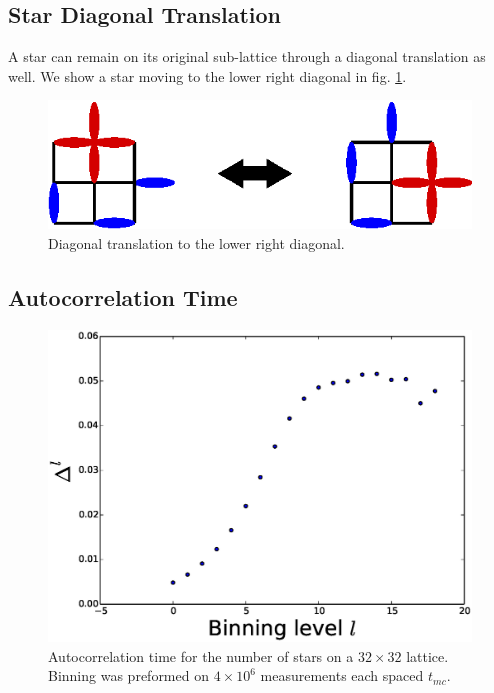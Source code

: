 \documentclass[aps,floatfix,11pt]{revtex4-1}
\begin{document}
\subsection{Star Diagonal Translation}
A star can remain on its original sub-lattice through a diagonal translation as well. We show a star moving
to the lower right diagonal in fig. \ref{fig:diag}. 
\begin{figure}[h]
    \centering
    \includegraphics[width=8.5 cm]{diag}
    \caption{Diagonal translation to the lower right diagonal.
\label{fig:diag}}
\end{figure}

\clearpage
\subsection{Autocorrelation Time}

\begin{figure}[h]
    \centering
    \includegraphics[width=8.5 cm]{auto_cor_num_stars}
    \caption{Autocorrelation time for the number of stars on a $32\times 32$ lattice. Binning was preformed on $4\times 10^6$
    measurements each spaced $t_{mc}$. \label{fig:auto_cor_num_stars}}
\end{figure}
\end{document}
